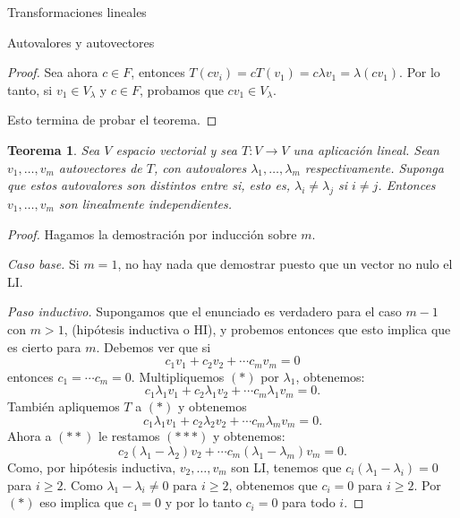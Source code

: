\documentclass[a4paper,12pt,twoside,spanish,reqno]{amsbook}
\newtheorem{teorema}{Teorema}[section]
\theoremstyle{definition}
\theoremstyle{remark}
\begin{document}
\begin{chapter}{Transformaciones lineales}
\begin{section}{Autovalores y autovectores}
\begin{proof}
            Sea ahora $c \in F$, entonces $T(cv_i) = cT(v_1) = c\lambda v_1 = \lambda (cv_1)$. Por lo tanto, si  $v_1\in V_\lambda$ y $c \in F$, probamos que $cv_1 \in V_\lambda$.
            
            Esto termina de probar el teorema.
        \end{proof}

        
        
        \begin{teorema}
            Sea $V$ espacio vectorial y sea $T: V \to V$ una aplicación lineal.  Sean $v_1,\ldots,v_m$ autovectores de $T$, con autovalores $\lambda_1,\ldots,\lambda_m$ respectivamente. Suponga que estos  autovalores son distintos entre si, esto es, $\lambda_i \ne \lambda_j$ si $i \ne j$. Entonces $v_1,\ldots,v_m$ son linealmente independientes.
        \end{teorema}
        \begin{proof}
            Hagamos la demostración por inducción sobre $m$.
            
            \textit{Caso base.} Si $m=1$, no hay nada que demostrar puesto que un vector no nulo el LI.
            
            \medskip
            
            \textit{Paso inductivo.} Supongamos que el enunciado es verdadero para el caso $m-1$ con $m>1$, (hipótesis inductiva o HI), y probemos entonces que esto implica que es cierto para $m$. Debemos ver  que si 
            \begin{equation}
            c_1v_1+	c_2v_2+ \cdots c_mv_m = 0 \tag{$*$}
            \end{equation}
            entonces $c_1 = \cdots c_m = 0$.
            Multipliquemos $(*)$ por $\lambda_1$, obtenemos:
            \begin{equation}
            c_1\lambda_1v_1+ c_2\lambda_1v_2+\cdots c_m\lambda_1v_m = 0. \tag{$**$}
            \end{equation}
            También apliquemos $T$ a $(*)$ y obtenemos
            \begin{equation}
            c_1\lambda_1v_1+ c_2\lambda_2v_2+\cdots c_m\lambda_mv_m = 0. \tag{$***$}
            \end{equation}
            Ahora a $(**)$ le restamos $(***)$ y obtenemos:
            \begin{equation}
            c_2(\lambda_1 -\lambda_2)v_2+\cdots c_m(\lambda_1 -\lambda_m)v_m = 0. 	 
            \end{equation}
            Como, por hipótesis inductiva, $v_2,\ldots,v_m$ son LI, tenemos que $c_i(\lambda_1 -\lambda_i)=0$ para $i\ge 2$. Como $\lambda_1 -\lambda_i \ne 0$ para $i\ge 2$, obtenemos que $c_i = 0$ para $i\ge 2$. Por $(*)$ eso implica que $c_1=0$ y por lo tanto $c_i=0$ para todo $i$.
        \end{proof}
        

\end{section}
\end{chapter}
\end{document}
